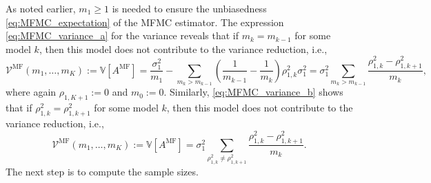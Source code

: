 As noted earlier,  $m_1 \ge 1$ is needed to ensure the unbiasedness \eqref{eq:MFMC_expectation}
of the MFMC estimator.
The expression  \eqref{eq:MFMC_variance_a} for the variance reveals that if
$m_k = m_{k-1}$ for some model $k$, then this model does not contribute to the variance reduction, i.e.,
\begin{equation}  \label{eq:MFMC_variance_ka}
    \mathcal{V}^{\text{MF}}(m_1, \ldots, m_K)
    :=  \mathbb{V}[A^{\text{MF}}]
    = \frac{\sigma_1^2}{m_1} 
       - \sum_{m_k > m_{k-1}} \left(\frac{1}{m_{k-1}} - \frac{1}{m_k}\right) \rho_{1,k}^2 \sigma_1^2
   = \sigma_1^2\sum_{m_k > m_{k-1}} \frac{ \rho_{1,k}^2 - \rho_{1,k+1}^2}{m_k},
\end{equation}
where again $\rho_{1,K+1} :=0$ and $m_0 := 0$.
Similarly,  \eqref{eq:MFMC_variance_b} shows that if $\rho_{1,k}^2 = \rho_{1,k+1}^2$ for some model $k$, 
then this model does not contribute to the variance reduction, i.e.,
\begin{equation}  \label{eq:MFMC_variance_kb}
    \mathcal{V}^{\text{MF}}(m_1, \ldots, m_K)
    :=  \mathbb{V}[A^{\text{MF}}]
   = \sigma_1^2\sum_{\rho_{1,k}^2 \not= \rho_{1,k+1}^2} \frac{ \rho_{1,k}^2 - \rho_{1,k+1}^2}{m_k}.
\end{equation}
The next step is to compute the sample sizes.

